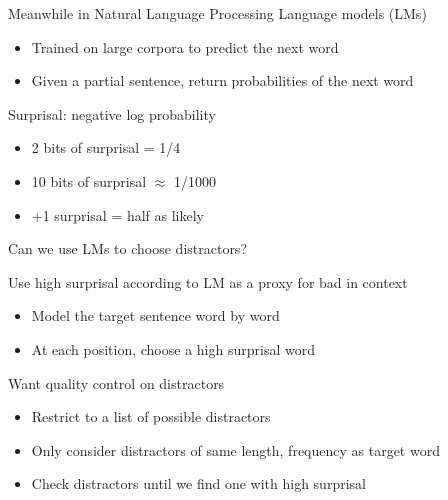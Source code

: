 \documentclass[12pt, xcolor=beamer,table,usenames,dvipsnames, ignorenonframetext, ngerman]{beamer}
\begin{document}
\begin{frame}{Meanwhile in Natural Language Processing}
\pause
Language models (LMs)
\begin{itemize}
	\item Trained on large corpora to predict the next word
	\item Given a partial sentence, return probabilities of the next word
\end{itemize}
\pause
Surprisal: negative log probability
\begin{itemize}
	\item 2 bits of surprisal = 1/4
	\item 10 bits of surprisal $\approx$ 1/1000 
	\item +1 surprisal = half as likely
\end{itemize}
\pause
{}
\end{frame}

\begin{frame}{Can we use LMs to choose distractors?} 

Use high surprisal according to LM as a proxy for bad in context
\medskip

\pause

\begin{itemize}
	\item Model the target sentence word by word \pause
	\item At each position, choose a high surprisal word
\end{itemize}
\medskip
\pause
Want quality control on distractors
\pause
\begin{itemize}
	\item Restrict to a list of possible distractors \pause
	\item Only consider distractors of same length, frequency as target word \pause
	\item Check distractors until we find one with high surprisal
\end{itemize}

\end{frame}
\end{document}
